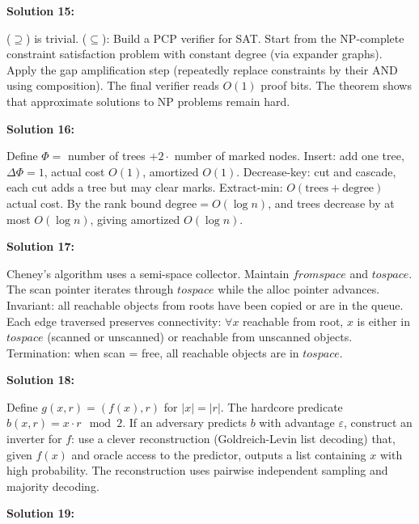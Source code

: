 \documentclass[12pt,a4paper]{exam}
\begin{document}
\vspace{0.5cm}

\textbf{Solution 15:}

($\supseteq$) is trivial. ($\subseteq$): Build a PCP verifier for SAT. Start from the NP-complete constraint satisfaction problem with constant degree (via expander graphs). Apply the gap amplification step (repeatedly replace constraints by their AND using composition). The final verifier reads $O(1)$ proof bits. The theorem shows that approximate solutions to NP problems remain hard.

\vspace{0.5cm}

\textbf{Solution 16:}

Define $\Phi =$ number of trees $+ 2 \cdot$ number of marked nodes. Insert: add one tree, $\Delta\Phi = 1$, actual cost $O(1)$, amortized $O(1)$. Decrease-key: cut and cascade, each cut adds a tree but may clear marks. Extract-min: $O(\text{trees} + \text{degree})$ actual cost. By the rank bound $\text{degree} = O(\log n)$, and trees decrease by at most $O(\log n)$, giving amortized $O(\log n)$.

\vspace{0.5cm}

\textbf{Solution 17:}

Cheney's algorithm uses a semi-space collector. Maintain $fromspace$ and $tospace$. The scan pointer iterates through $tospace$ while the alloc pointer advances. Invariant: all reachable objects from roots have been copied or are in the queue. Each edge traversed preserves connectivity: $\forall x$ reachable from root, $x$ is either in $tospace$ (scanned or unscanned) or reachable from unscanned objects. Termination: when scan = free, all reachable objects are in $tospace$.

\vspace{0.5cm}

\textbf{Solution 18:}

Define $g(x,r) = (f(x), r)$ for $|x| = |r|$. The hardcore predicate $b(x,r) = x \cdot r \mod 2$. If an adversary predicts $b$ with advantage $\varepsilon$, construct an inverter for $f$: use a clever reconstruction (Goldreich-Levin list decoding) that, given $f(x)$ and oracle access to the predictor, outputs a list containing $x$ with high probability. The reconstruction uses pairwise independent sampling and majority decoding.

\vspace{0.5cm}

\textbf{Solution 19:}
\end{document}
